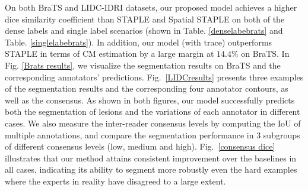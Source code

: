 On both BraTS and LIDC-IDRI datasets, our proposed model achieves a higher dice similarity coefficient than STAPLE and Spatial STAPLE on both of the dense labels and single label scenarios (shown in Table. \ref{denselabebrats} and Table. \ref{singlelabebrats}). In addition, our model (with trace) outperforms STAPLE in terms of CM estimation by a large margin at $14.4\%$ on BraTS. In Fig. \ref{Brats results}, we visualize the segmentation results on BraTS and the corresponding annotators' predictions. Fig.~\ref{LIDCresults} presents three examples of the segmentation results and the corresponding four annotator contours, as well as the consensus. As shown in both figures, our model successfully predicts both the segmentation of lesions and the variations of each annotator in different cases. We also measure the inter-reader consensus levels by computing the IoU of multiple annotations, and compare the segmentation performance in 3 subgroups of different consensus levels (low, medium and high). Fig.~\ref{consensus dice} illustrates that 
our method attains consistent improvement over the baselines in all cases, indicating its ability to segment more robustly even the hard examples where the experts in reality have disagreed to a large extent. 


